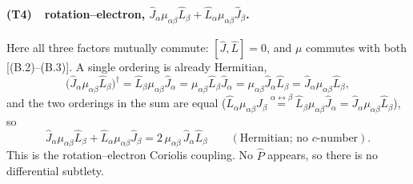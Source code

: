 \paragraph{(T4)\ \ rotation--electron, $\hat J_\alpha\mu_{\alpha\beta}\hat L_\beta+\hat L_\alpha\mu_{\alpha\beta}\hat J_\beta$.}
Here all three factors mutually commute: $[\hat J,\hat L]=0$, and $\mu$ commutes with both [(B.2)--(B.3)]. A single ordering is already Hermitian,
\begin{equation*}
\bigl(\hat J_\alpha\mu_{\alpha\beta}\hat L_\beta\bigr)^{\dagger}
=\hat L_\beta\mu_{\alpha\beta}\hat J_\alpha
=\mu_{\alpha\beta}\hat L_\beta\hat J_\alpha
=\mu_{\alpha\beta}\hat J_\alpha\hat L_\beta
=\hat J_\alpha\mu_{\alpha\beta}\hat L_\beta ,
\end{equation*}
and the two orderings in the sum are equal ($\hat L_\alpha\mu_{\alpha\beta}\hat J_\beta\overset{\alpha\leftrightarrow\beta}{=}\hat L_\beta\mu_{\alpha\beta}\hat J_\alpha=\hat J_\alpha\mu_{\alpha\beta}\hat L_\beta$), so
\begin{equation}
\hat J_\alpha\mu_{\alpha\beta}\hat L_\beta+\hat L_\alpha\mu_{\alpha\beta}\hat J_\beta
=2\,\mu_{\alpha\beta}\,\hat J_\alpha\hat L_\beta
\qquad(\text{Hermitian; no }c\text{-number}). \tag{B.11}
\end{equation}
This is the rotation--electron Coriolis coupling. No $\hat P$ appears, so there is no differential subtlety.

